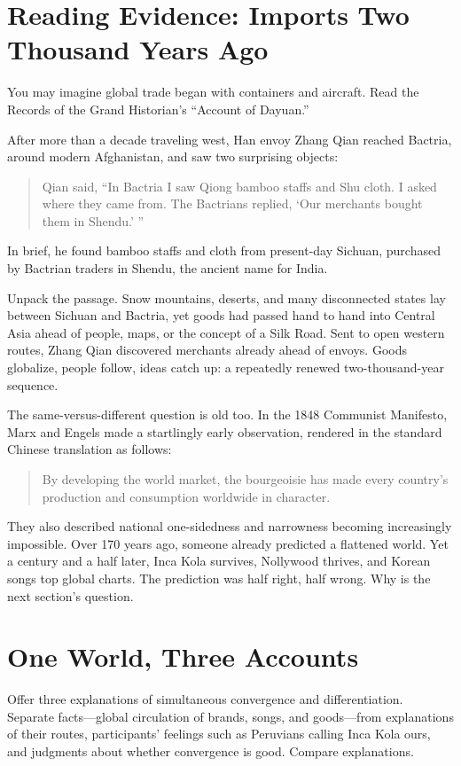 \section[Imports Two Thousand Years Ago]{Reading Evidence: Imports Two Thousand Years Ago}
You may imagine global trade began with containers and aircraft. Read the Records of the Grand Historian's ``Account of Dayuan.''

After more than a decade traveling west, Han envoy Zhang Qian reached Bactria, around modern Afghanistan, and saw two surprising objects:

\begin{quote}
Qian said, ``In Bactria I saw Qiong bamboo staffs and Shu cloth. I asked where they came from. The Bactrians replied, `Our merchants bought them in Shendu.' ''
\end{quote}
In brief, he found bamboo staffs and cloth from present-day Sichuan, purchased by Bactrian traders in Shendu, the ancient name for India.

Unpack the passage. Snow mountains, deserts, and many disconnected states lay between Sichuan and Bactria, yet goods had passed hand to hand into Central Asia ahead of people, maps, or the concept of a Silk Road. Sent to open western routes, Zhang Qian discovered merchants already ahead of envoys. Goods globalize, people follow, ideas catch up: a repeatedly renewed two-thousand-year sequence.

The same-versus-different question is old too. In the 1848 Communist Manifesto, Marx and Engels made a startlingly early observation, rendered in the standard Chinese translation as follows:

\begin{quote}
By developing the world market, the bourgeoisie has made every country's production and consumption worldwide in character.
\end{quote}
They also described national one-sidedness and narrowness becoming increasingly impossible. Over 170 years ago, someone already predicted a flattened world. Yet a century and a half later, Inca Kola survives, Nollywood thrives, and Korean songs top global charts. The prediction was half right, half wrong. Why is the next section's question.

\section{One World, Three Accounts}
Offer three explanations of simultaneous convergence and differentiation. Separate facts---global circulation of brands, songs, and goods---from explanations of their routes, participants' feelings such as Peruvians calling Inca Kola ours, and judgments about whether convergence is good. Compare explanations.

